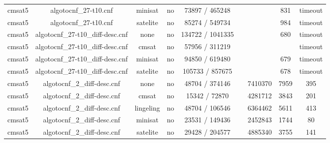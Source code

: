 \begin{appendices}
\begin{table}[p]
\begin{center}
\begin{tabular}{l|cccccccc}
  cmsat5                         & algotocnf\_27-t10.cnf          & minisat    & no    & 73897 / 465248 &           &           & 831        & timeout \\ %
  cmsat5                         & algotocnf\_27-t10.cnf          & satelite   & no    & 85274 / 549734 &           &           & 984        & timeout \\ %
  cmsat5                         & algotocnf\_27-t10\_diff-desc.cnf & none       & no    & 134722 / 1041335 &           &           & 680        & timeout \\ %
  cmsat5                         & algotocnf\_27-t10\_diff-desc.cnf & cmsat      & no    & 57956 / 311219 &           &           &            & timeout \\ %
  cmsat5                         & algotocnf\_27-t10\_diff-desc.cnf & minisat    & no    & 94850 / 619480 &           &           & 679        & timeout \\ %
  cmsat5                         & algotocnf\_27-t10\_diff-desc.cnf & satelite   & no    & 105733 / 857675 &           &           & 678        & timeout \\ %
  cmsat5                         & algotocnf\_2\_diff-desc.cnf    & none       & no    & 48704 / 374146 &           & 7410370   & 7959       & 395 \\ %
  cmsat5                         & algotocnf\_2\_diff-desc.cnf    & cmsat      & no    & 15342 / 72870 &           & 4281712   & 3843       & 201 \\ %
  cmsat5                         & algotocnf\_2\_diff-desc.cnf    & lingeling  & no    & 48704 / 106546 &           & 6364462   & 5611       & 413 \\ %
  cmsat5                         & algotocnf\_2\_diff-desc.cnf    & minisat    & no    & 23531 / 149436 &           & 2452843   & 1744       & 80 \\ %
  cmsat5                         & algotocnf\_2\_diff-desc.cnf    & satelite   & no    & 29428 / 204577 &           & 4885340   & 3755       & 141 \\ %

\end{tabular}
\end{center}
\end{table}
\end{appendices}
